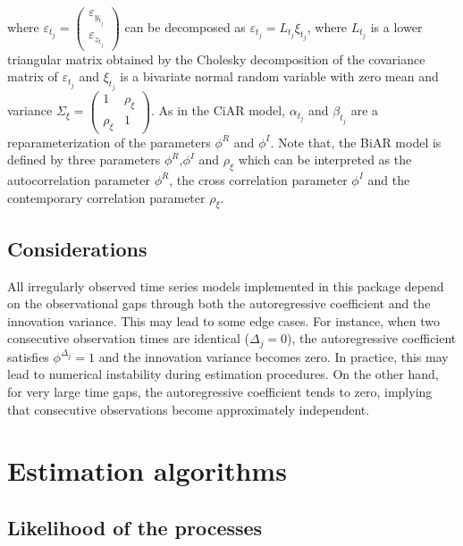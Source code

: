 where \(\varepsilon_{t_{j}} =  \left(\begin{array}{c} \varepsilon_{y_{t_j}} \\ \varepsilon_{z_{t_j}} \end{array} \right)\) can be decomposed as \(\varepsilon_{t_{j}} = L_{t_{j}} \xi_{t_j}\), where \(L_{t_j}\) is a lower triangular matrix obtained by the Cholesky decomposition of the covariance matrix of \(\varepsilon_{t_{j}}\) and \(\xi_{t_j}\) is a bivariate normal random variable with zero mean and variance \(\Sigma_{\xi} = \left(\begin{array}{cc}1 & \rho_{\xi} \\ \rho_{\xi} & 1 \end{array} \right)\). As in the CiAR model, \(\alpha_{t_j}\) and \(\beta_{t_j}\) are a reparameterization of the parameters \(\phi^R\) and \(\phi^I\). Note that, the BiAR model is defined by three parameters \(\phi^R\),\(\phi^I\) and \(\rho_{\xi}\) which can be interpreted as the autocorrelation parameter \(\phi^R\), the cross correlation parameter \(\phi^I\) and the contemporary correlation parameter \(\rho_{\xi}\).

\subsection{Considerations}\label{considerations}

All irregularly observed time series models implemented in this package depend on the observational gaps through both the autoregressive coefficient and the innovation variance. This may lead to some edge cases. For instance, when two consecutive observation times are identical (\(\Delta_j = 0\)), the autoregressive coefficient satisfies \(\phi^{\Delta_j}=1\) and the innovation variance becomes zero. In practice, this may lead to numerical instability during estimation procedures. On the other hand, for very large time gaps, the autoregressive coefficient tends to zero, implying that consecutive observations become approximately independent.

\section{Estimation algorithms}\label{sec:estimation}

\subsection{Likelihood of the processes}\label{likelihood-of-the-processes}

